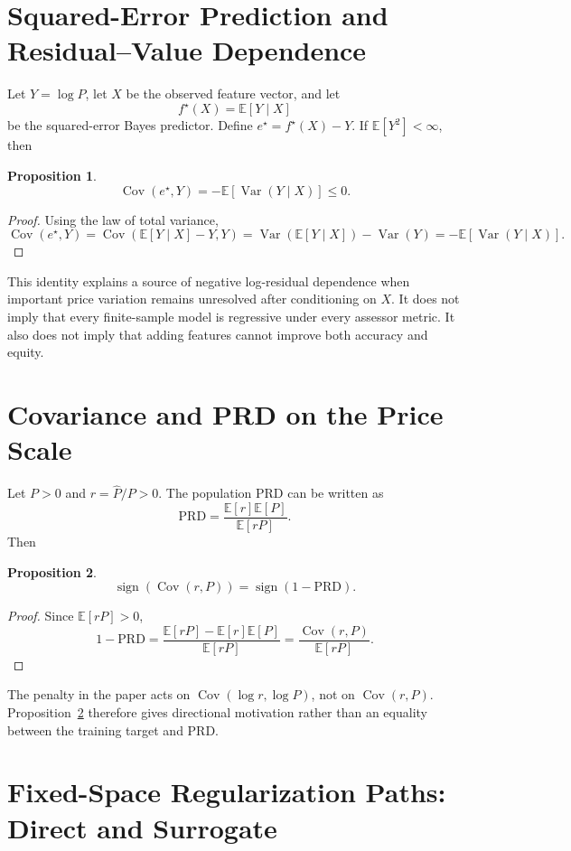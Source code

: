 \documentclass[10pt]{article}
\newtheorem{proposition}{Proposition}
\theoremstyle{definition}
\newcommand{\E}{\mathbb{E}}
\newcommand{\Cov}{\operatorname{Cov}}
\newcommand{\Var}{\operatorname{Var}}
\newcommand{\1}{\mathbf{1}}
\begin{document}
\section{Squared-Error Prediction and Residual--Value Dependence}
\label{app:population_identity}

Let $Y=\log P$, let $X$ be the observed feature vector, and let
\[
f^\star(X)=\E[Y\mid X]
\]
be the squared-error Bayes predictor. Define $e^\star=f^\star(X)-Y$. If $\E[Y^2]<\infty$, then
\begin{proposition}
\label{prop:bayes_covariance}
\[
\Cov(e^\star,Y)
=
-\E[\Var(Y\mid X)]
\le 0.
\]
\end{proposition}
\begin{proof}
Using the law of total variance,
\[
\Cov(e^\star,Y)
=
\Cov(\E[Y\mid X]-Y,Y)
=
\Var(\E[Y\mid X])-\Var(Y)
=
-\E[\Var(Y\mid X)].
\]
\end{proof}

This identity explains a source of negative log-residual dependence when important price variation remains unresolved after conditioning on $X$. It does not imply that every finite-sample model is regressive under every assessor metric. It also does not imply that adding features cannot improve both accuracy and equity.

\section{Covariance and PRD on the Price Scale}
\label{app:cov_prd}

Let $P>0$ and $r=\widehat P/P>0$. The population PRD can be written as
\[
\mathrm{PRD}
=
\frac{\E[r]\E[P]}{\E[rP]}.
\]
Then
\begin{proposition}
\label{prop:cov_prd}
\[
\operatorname{sign}\!\left(\Cov(r,P)\right)
=
\operatorname{sign}(1-\mathrm{PRD}).
\]
\end{proposition}
\begin{proof}
Since $\E[rP]>0$,
\[
1-\mathrm{PRD}
=
\frac{\E[rP]-\E[r]\E[P]}{\E[rP]}
=
\frac{\Cov(r,P)}{\E[rP]}.
\]
\end{proof}

The penalty in the paper acts on $\Cov(\log r,\log P)$, not on $\Cov(r,P)$. Proposition~\ref{prop:cov_prd} therefore gives directional motivation rather than an equality between the training target and PRD.

\section{\texorpdfstring{Fixed-Space Regularization Paths: Direct and Surrogate}{Fixed-Space Regularization Paths: Direct and Surrogate}}
\label{app:theory}
\end{document}
